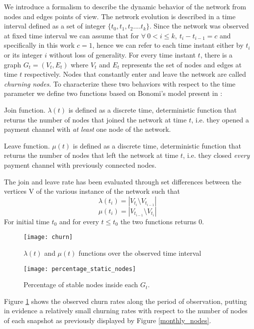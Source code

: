 	
	We introduce a formalism to describe the dynamic behavior of the network from nodes and edges points of view. The network evolution is described in a time interval defined as a set of integer $\{t_0, t_1, t_2 .... t_k \}$. Since the network was observed at fixed time interval  we can assume that for $\forall \: 0 < i \leq k,\: t_i-t_{i-1} = c$ and specifically in this work $c = 1$, hence we can refer to each time instant either by $t_i$ or its integer $i$ without loss of generality. For every time instant $t$, there is a graph $G_{t}= (V_t,E_t)$ where $V_t$ and $E_t$ represents the set of nodes and edges at time $t$ respectively. Nodes that constantly enter and leave the network are called \textit{churning nodes}. To characterize these two behaviors with respect to the time parameter we define two functions based on Bonomi's model present in \cite{Baldoni2010}:
	\begin{definition}
		Join function. $\lambda(t)$ is defined as a discrete time, deterministic function that returns the number of nodes that joined the network at time $t$, i.e. they opened a payment channel with \textit{at least} one node of the network.
	\end{definition}
	\begin{definition}
		Leave function. $\mu(t)$ is defined as a discrete time, deterministic function that returns the number of nodes that left the network at time $t$, i.e. they closed \textit{every} payment channel with previously connected nodes.
	\end{definition}
	The join and leave rate has been evaluated through set differences between the vertices V of the various instance of the network such that
	$$\lambda(t_i) = |V_{t_i} \setminus V_{t_{i-1}}|$$
	$$\mu(t_i) = |V_{t_{i-1}} \setminus V_{t_i}| $$
	For initial time $t_0$ and for every $t \leq t_0$ the two functions returns 0.
	\begin{figure}[h]
		\texttt{[image: churn]}
		\caption{$\lambda(t)$ and $\mu(t)$ functions over the observed time interval}
		\label{churn}
	\end{figure}
	\begin{figure}
		\texttt{[image: percentage\_static\_nodes]}
		\caption{Percentage of stable nodes inside each $G_t$.}
		\label{percentage_static_nodes}
	\end{figure}
	Figure \ref{churn} shows the observed churn rates along the period of observation, putting in evidence a relatively small churning rates with respect to the number of nodes of each snapshot as previously displayed by Figure \ref{monthly_nodes}.
	
